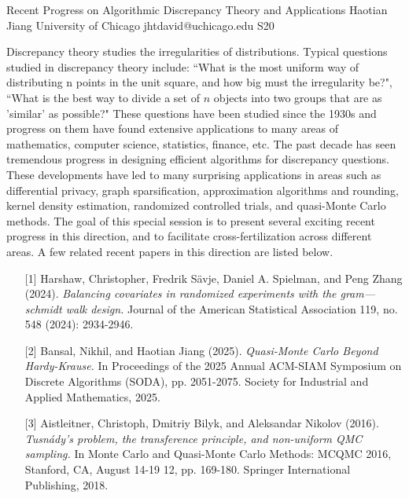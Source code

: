 \begin{session}
 {Recent Progress on Algorithmic Discrepancy Theory and Applications}%
 {Haotian Jiang}%
 {University of Chicago}%
 {jhtdavid@uchicago.edu}%
{}{}{}
 {S20}%
{}

 Discrepancy theory studies the irregularities of distributions. Typical questions studied in discrepancy theory include: ``What is the most uniform way of distributing n points in the unit square, and how big must the irregularity be?", ``What is the best way to divide a set of $n$ objects into two groups that are as 'similar' as possible?" These questions have been studied since the 1930s and progress on them have found extensive applications to many areas of mathematics, computer science, statistics, finance, etc.
 The past decade has seen tremendous progress in designing efficient algorithms for discrepancy questions. These developments have led to many surprising applications in areas such as differential privacy, graph sparsification, approximation algorithms and rounding, kernel density estimation, randomized controlled trials, and quasi-Monte Carlo methods.
 The goal of this special session is to present several exciting recent progress in this direction, and to facilitate cross-fertilization across different areas.
 \medskip
 A few related recent papers in this direction are listed below.
 \begin{enumerate}
 \item [{[1]}] Harshaw, Christopher, Fredrik S\"avje, Daniel A. Spielman, and Peng Zhang (2024). {\it Balancing covariates in randomized experiments with the gram---schmidt walk design.} Journal of the American Statistical Association 119, no. 548 (2024): 2934-2946.
 \item[{[2]}] Bansal, Nikhil, and Haotian Jiang (2025). {\it Quasi-Monte Carlo Beyond Hardy-Krause.} In Proceedings of the 2025 Annual ACM-SIAM Symposium on Discrete Algorithms (SODA), pp. 2051-2075. Society for Industrial and Applied Mathematics, 2025.
 \item [{[3]}] Aistleitner, Christoph, Dmitriy Bilyk, and Aleksandar Nikolov (2016). {\it Tusnády’s problem, the transference principle, and non-uniform QMC sampling.} In Monte Carlo and Quasi-Monte Carlo Methods: MCQMC 2016, Stanford, CA, August 14-19 12, pp. 169-180. Springer International Publishing, 2018.
 \end{enumerate}
\end{session}

